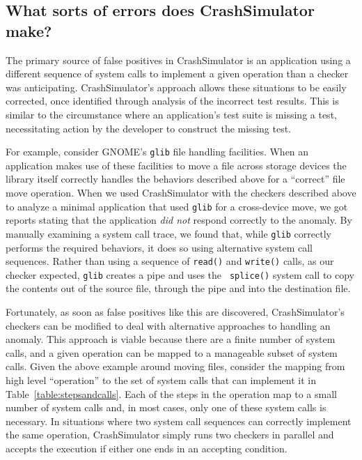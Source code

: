 \subsection{What sorts of errors does CrashSimulator make?}
\label{sec-sorts-errors}


The primary source of false positives in CrashSimulator is an application
using a different sequence of system calls to implement a given operation
than a checker was anticipating. CrashSimulator's approach allows these
situations to be easily corrected, once identified through analysis of the
incorrect test results.  This is similar to the circumstance where an
application's test suite is missing a test, necessitating action by the
developer to construct the missing test.

For example, consider GNOME's {\tt glib} file handling facilities.  When an
application makes use of these facilities to move a file across storage
devices the library itself correctly handles the behaviors described above
for a ``correct'' file move operation.  When we used CrashSimulator with
the checkers described above to analyze a minimal application that used
{\tt glib} for a cross-device move, we got reports stating that the
application {\em did not} respond correctly to the anomaly.  By manually
examining a system call trace, we found that, while {\tt glib} correctly
performs the required behaviors, it does so using alternative system call
sequences.  Rather than using a sequence of {\tt read()} and {\tt write()}
calls, as our checker expected, {\tt glib} creates a pipe and uses the {\tt
splice()} system call to copy the contents out of the source file, through
the pipe and into the destination file.

Fortunately, as soon as false positives like this are discovered,
CrashSimulator's checkers can be modified to deal with alternative
approaches to handling an anomaly.  This approach is viable because there
are a finite number of system calls, and a given operation can be mapped to
a manageable subset of system calls.  Given the above example around moving
files, consider the mapping from high level ``operation'' to the set of
system calls that can implement it in Table~\ref{table:stepsandcalls}.
Each of the steps in the operation map to a small number of system calls
and, in most cases, only one of these system calls is necessary.  In
situations where two system call sequences can correctly implement the same
operation, CrashSimulator simply runs two checkers in parallel and accepts
the execution if either one ends in an accepting condition.

